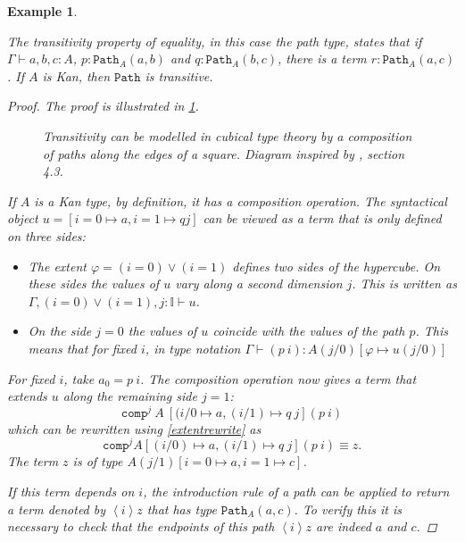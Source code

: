 \documentclass[12pt,a4paper,twoside,xetex]{book}
\newcommand{\keyword}[1]{\emph{#1}\index{#1}}
\newtheorem{example}[theorem]{Example}
\newcommand{\op}[1]{\mathtt{#1}}
\newcommand{\pa}[3]{\op{Path}_{#1}\left(#2, #3\right)}
\begin{document}
\begin{example}\label{pathtransitivity}

The \keyword{transitivity} property of equality, in this case the path type, 
states that if $\Gamma \vdash a,b,c : A$, $p: \op{Path}_A(a,b)$ and $q: 
\op{Path}_A(b,c)$, there is a term $r : \op{Path}_A(a,c)$. If $A$ is Kan, then 
$\op{Path}$ is transitive.	

\begin{proof}
The proof is illustrated in \cref{transdiag}.

\begin{figure}\label{transdiag}

\caption{Transitivity can be modelled in cubical type theory by a  composition 
of paths along the edges of a square. Diagram inspired by \cite{Cohen2016}, 
section 4.3.}
\end{figure}

If $A$ is a Kan type, by definition, it has a composition operation. The 
syntactical object $u = [i=0 \mapsto a, i=1 \mapsto q j]$ can be viewed as a 
term that is only defined on three sides:

\begin{itemize}
\item The extent $\varphi = (i=0) \vee (i=1)$ defines two sides of the 
hypercube. On these sides the values of $u$ vary along a second dimension $j$. 
This is written as $\Gamma, (i=0)\vee (i=1), j : \mathbb{I} \vdash u$.
\item On the side $j=0$ the values of $u$ coincide with the values of the path 
$p$. This means that for fixed $i$, in type notation $\Gamma \vdash (p \  i) : 
A(j/0)[\varphi \mapsto u(j/0)]$

\end{itemize}

For fixed $i$, take $a_0 = p \  i$. The composition operation now gives a 
term that extends $u$ along the remaining side $j=1$: $$\op{comp}^j\ A\ [(i/0 
\mapsto a, (i/1) \mapsto q\ j] (p\ i)$$ which can be rewritten using  
\cref{extentrewrite} as $$\op{comp}^j A [(i/0) \mapsto a, (i/1) \mapsto q \ j] 
(p \  i) \equiv z.$$ The term $z$ is of type $A(j/1)[i=0 \mapsto a, i=1 \mapsto 
c]$.

If this term depends on $i$, the introduction rule of a 
path can be applied to return a term denoted by $\left< i \right> z$ that has 
type $\pa{A}{a}{c}$. To verify this it is necessary to check that the endpoints 
of this path $\left< i \right> z$ are indeed $a$ and $c$.


\end{proof}
\end{example}
\end{document}
